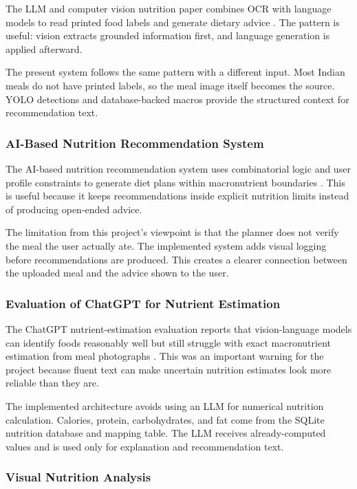 The LLM and computer vision nutrition paper combines OCR with language models to read printed food labels and generate dietary advice \cite{ocr_llm_nutrition_2026}. The pattern is useful: vision extracts grounded information first, and language generation is applied afterward.

The present system follows the same pattern with a different input. Most Indian meals do not have printed labels, so the meal image itself becomes the source. YOLO detections and database-backed macros provide the structured context for recommendation text.

\subsubsection{AI-Based Nutrition Recommendation System}

The AI-based nutrition recommendation system uses combinatorial logic and user profile constraints to generate diet plans within macronutrient boundaries \cite{ai_nutrition_recommender_2025}. This is useful because it keeps recommendations inside explicit nutrition limits instead of producing open-ended advice.

The limitation from this project's viewpoint is that the planner does not verify the meal the user actually ate. The implemented system adds visual logging before recommendations are produced. This creates a clearer connection between the uploaded meal and the advice shown to the user.

\subsubsection{Evaluation of ChatGPT for Nutrient Estimation}

The ChatGPT nutrient-estimation evaluation reports that vision-language models can identify foods reasonably well but still struggle with exact macronutrient estimation from meal photographs \cite{chatgpt_nutrient_estimation_2025}. This was an important warning for the project because fluent text can make uncertain nutrition estimates look more reliable than they are.

The implemented architecture avoids using an LLM for numerical nutrition calculation. Calories, protein, carbohydrates, and fat come from the SQLite nutrition database and mapping table. The LLM receives already-computed values and is used only for explanation and recommendation text.

\subsubsection{Visual Nutrition Analysis}

